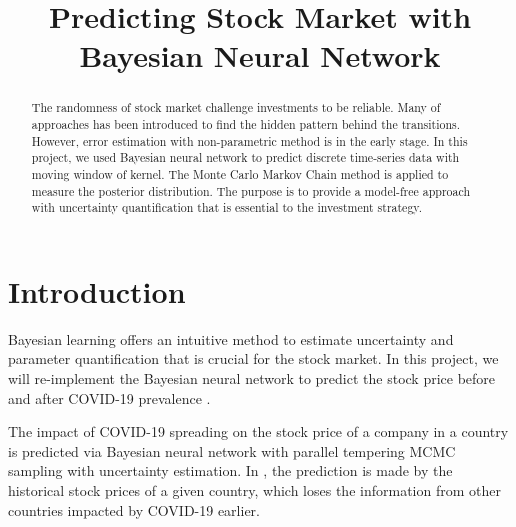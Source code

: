 \documentclass{article}
\title{Predicting Stock Market with Bayesian Neural Network}
\begin{document}
\maketitle


\begin{abstract}
The randomness of stock market challenge investments to be reliable. Many of approaches has been introduced to find the hidden pattern behind the transitions. However, error estimation with non-parametric method is in the early stage. In this project, we used Bayesian neural network to predict discrete  time-series data with moving window of kernel. The Monte Carlo Markov Chain method is applied to measure the posterior distribution. The purpose is to provide a model-free approach with uncertainty quantification that is essential to the investment strategy. 
\end{abstract}

\section{Introduction}





Bayesian learning offers an intuitive method to estimate uncertainty and parameter quantification that is crucial for the stock market.  In this project, we will re-implement the Bayesian neural network to predict the stock price before and after COVID-19 prevalence \cite{chandra2021bayesian}. 




The impact of COVID-19 spreading on the stock price of a company in a country is predicted via Bayesian neural network with parallel tempering MCMC sampling\cite{chandra2021bayesian, chandra2019langevin} with uncertainty estimation. In \cite{chandra2021bayesian}, the prediction is made by the historical stock prices of a given country, which loses the information from other countries impacted by COVID-19 earlier. 
\end{document}
